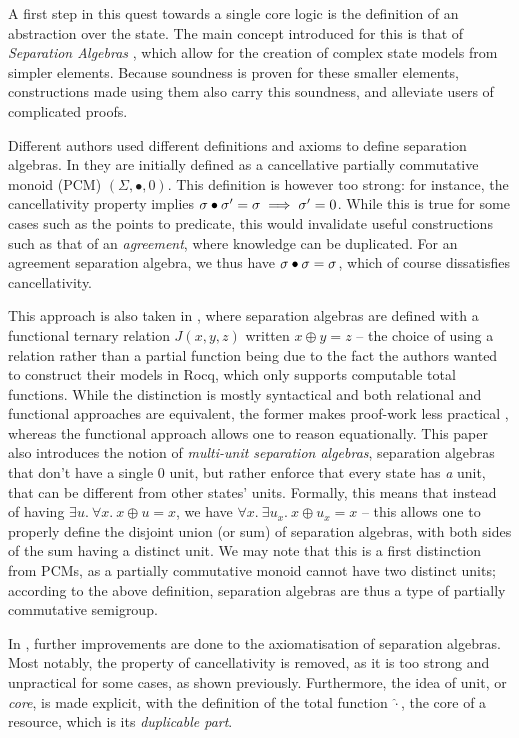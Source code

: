 A first step in this quest towards a single core logic is the definition of an abstraction over the state. The main concept introduced for this is that of \emph{Separation Algebras} \cite{abstractseplogic, sepalgebra}, which allow for the creation of complex state models from simpler elements. Because soundness is proven for these smaller elements, constructions made using them also carry this soundness, and alleviate users of complicated proofs.

Different authors used different definitions and axioms to define separation algebras. In \cite{abstractseplogic} they are initially defined as a cancellative partially commutative monoid (PCM) $(\Sigma, \bullet, 0)$. This definition is however too strong: for instance, the cancellativity property implies $\sigma\bullet\sigma'=\sigma \implies \sigma'=0$. While this is true for some cases such as the points to predicate, this would invalidate useful constructions such as that of an \emph{agreement}, where knowledge can be duplicated. For an agreement separation algebra, we thus have $\sigma \bullet \sigma = \sigma$, which of course dissatisfies cancellativity.

This approach is also taken in \cite{sepalgebra}, where separation algebras are defined with a functional ternary relation $J(x,y,z)$ written $x\oplus y=z$ -- the choice of using a relation rather than a partial function being due to the fact the authors wanted to construct their models in Rocq, which only supports computable total functions. While the distinction is mostly syntactical and both relational and functional approaches are equivalent, the former makes proof-work less practical \cite{statesoundness, iris}, whereas the functional approach allows one to reason equationally. This paper also introduces the notion of \emph{multi-unit separation algebras}, separation algebras that don't have a single $0$ unit, but rather enforce that every state has \emph{a} unit, that can be different from other states' units. Formally, this means that instead of having $\exists u.~\forall x.~x \oplus u = x$, we have $\forall x.~\exists u_x.~ x\oplus u_x=x$ -- this allows one to properly define the disjoint union (or sum) of separation algebras, with both sides of the sum having a distinct unit. We may note that this is a first distinction from PCMs, as a partially commutative monoid cannot have two distinct units; according to the above definition, separation algebras are thus a type of partially commutative semigroup.

In \cite{statesoundness}, further improvements are done to the axiomatisation of separation algebras. Most notably, the property of cancellativity is removed, as it is too strong and unpractical for some cases, as shown previously. Furthermore, the idea of unit, or \emph{core}, is made explicit, with the definition of the total function $\hat\cdot$, the core of a resource, which is its \emph{duplicable part}.

